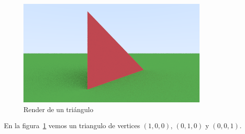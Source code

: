 \begin{figure}[H]
    \centering
    \includegraphics[width=.9\textwidth]{imgs/escena_triangulo}
    \caption{Render de un triángulo}
    \label{fig:escena_triangulo}
\end{figure}

En la figura~\ref{fig:escena_triangulo} vemos un triangulo de vertices $(1,0,0)$, $(0,1,0)$ y $
(0,0,1)$.